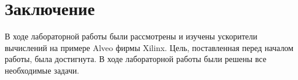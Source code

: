 \chapter*{Заключение}

В ходе лабораторной работы были рассмотрены и изучены ускорители вычислений на примере Alveo фирмы Xilinx. Цель, поставленная перед началом работы, была достигнута. В ходе лабораторной работы были решены все необходимые задачи.
